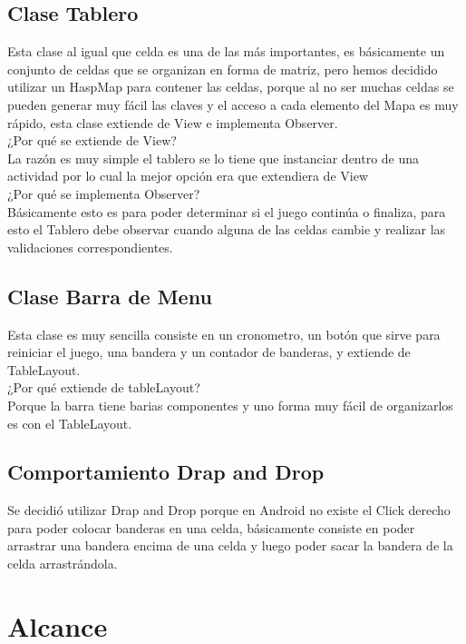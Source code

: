 \documentclass[11pt]{article} %
\begin{document}
\subsection{Clase Tablero}
Esta clase al igual que celda es una de las más importantes, es básicamente un conjunto de celdas que se organizan en forma de matriz, pero hemos decidido utilizar un HaspMap para contener las celdas, porque al no ser muchas celdas se pueden generar muy fácil las claves y el acceso a cada elemento del Mapa es muy rápido, esta clase extiende de View e implementa Observer.\\
¿Por qué se extiende de View?\\
La razón es muy simple el tablero se lo tiene que instanciar dentro de una actividad por lo cual la mejor opción era que extendiera de View\\
¿Por qué se implementa Observer?\\
Básicamente esto es para poder determinar si el juego continúa o finaliza, para esto el Tablero debe observar cuando alguna de las celdas cambie y realizar las validaciones correspondientes.\\

\subsection{Clase Barra de Menu}
Esta clase es muy sencilla consiste en un cronometro, un botón que sirve para reiniciar el juego, una bandera y un contador de banderas, y extiende de TableLayout.\\
¿Por qué extiende de tableLayout?\\
Porque la barra tiene barias componentes y uno forma muy fácil de organizarlos es con el TableLayout.\\

\subsection{Comportamiento Drap and Drop}
Se decidió utilizar Drap and Drop porque en Android no existe el Click derecho para poder colocar banderas en una celda, básicamente consiste en poder arrastrar una bandera encima de una celda y luego poder sacar la bandera de la celda arrastrándola.





\section{Alcance}
\end{document}

